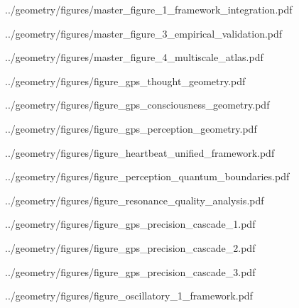 

../geometry/figures/master_figure_1_framework_integration.pdf

../geometry/figures/master_figure_3_empirical_validation.pdf

../geometry/figures/master_figure_4_multiscale_atlas.pdf



../geometry/figures/figure_gps_thought_geometry.pdf

../geometry/figures/figure_gps_consciousness_geometry.pdf

../geometry/figures/figure_gps_perception_geometry.pdf



../geometry/figures/figure_heartbeat_unified_framework.pdf

../geometry/figures/figure_perception_quantum_boundaries.pdf

../geometry/figures/figure_resonance_quality_analysis.pdf



../geometry/figures/figure_gps_precision_cascade_1.pdf

../geometry/figures/figure_gps_precision_cascade_2.pdf

../geometry/figures/figure_gps_precision_cascade_3.pdf



../geometry/figures/figure_oscillatory_1_framework.pdf

